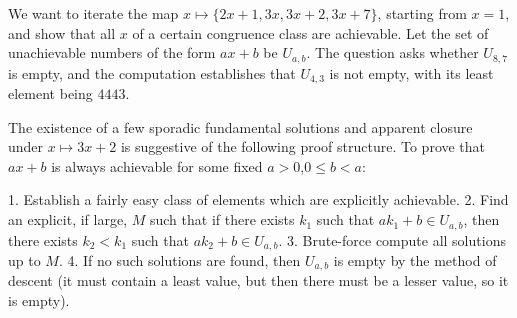 \documentclass{article}
\begin{document}
We want to iterate the map $x\mapsto \{2x+1, 3x, 3x+2, 3x+7\}$, starting from $x=1$, and show that all $x$ of a certain congruence class are achievable. Let the set of unachievable numbers of the form $ax+b$ be $U_{a,b}$. The question asks whether $U_{8,7}$ is empty, and the computation establishes that $U_{4,3}$ is not empty, with its least element being $4443$.

The existence of a few sporadic fundamental solutions and apparent closure under $x\mapsto 3x+2$ is suggestive of the following proof structure. To prove that $ax+b$ is always achievable for some fixed $a>0$,$0\leq b<a$:

1. Establish a fairly easy class of elements which are explicitly achievable.
2. Find an explicit, if large, $M$ such that if there exists $k_1$ such that $ak_1+b\in U_{a,b}$, then there exists $k_2<k_1$ such that $ak_2+b\in U_{a,b}$.
3. Brute-force compute all solutions up to $M$.
4. If no such solutions are found, then $U_{a,b}$ is empty by the method of descent (it must contain a least value, but then there must be a lesser value, so it is empty).
\end{document}
